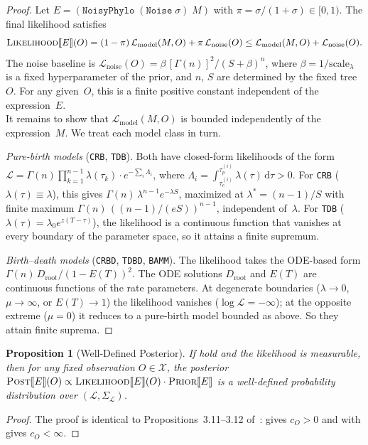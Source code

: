 \documentclass[11pt,a4paper]{article}
\newtheorem{proposition}[proposition]{Proposition}
\newcommand{\LL}{\mathcal{L}}
\newcommand{\XX}{\mathcal{X}}
\newcommand{\Prior}{\textsc{Prior}}
\newcommand{\Likelihood}{\textsc{Likelihood}}
\newcommand{\Post}{\textsc{Post}}
\newcommand{\sem}[1]{\llbracket #1 \rrbracket}
\begin{document}
\begin{proof}
Let $E = (\texttt{NoisyPhylo}\;(\texttt{Noise}\;\sigma)\;M)$ with
$\pi = \sigma/(1+\sigma) \in [0,1)$.  The final likelihood satisfies
\begin{equation}\label{eq:lik-split}
  \Likelihood\sem{E}(O)
  = (1-\pi)\,\LL_{\mathrm{model}}(M, O)
  + \pi\,\LL_{\mathrm{noise}}(O)
  \leq \LL_{\mathrm{model}}(M, O) + \LL_{\mathrm{noise}}(O).
\end{equation}
The noise baseline is
$\LL_{\mathrm{noise}}(O) = \beta\,[\Gamma(n)]^2 / (S+\beta)^n$, where
$\beta = 1/\text{scale}_\lambda$ is a fixed hyperparameter of the
prior, and $n$, $S$ are determined by the fixed tree~$O$.  For any
given~$O$, this is a finite positive constant independent of the
expression~$E$.\\
It remains to show that $\LL_{\mathrm{model}}(M, O)$ is bounded
independently of the expression~$M$.  We treat each model class in
turn.

\emph{Pure-birth models} (\texttt{CRB}, \texttt{TDB}).  Both have
closed-form likelihoods of the form
$\LL = \Gamma(n) \prod_{k=1}^{n-1} \lambda(\tau_k)
\cdot e^{-\sum_i \Lambda_i}$,
where $\Lambda_i = \int_{\tau_c^{(i)}}^{\tau_p^{(i)}} \lambda(\tau)\,
\mathrm{d}\tau > 0$.  For \texttt{CRB} ($\lambda(\tau) \equiv \lambda$),
this gives $\Gamma(n)\,\lambda^{n-1} e^{-\lambda S}$, maximized at
$\lambda^* = (n-1)/S$ with finite maximum
$\Gamma(n)\,((n-1)/(eS))^{n-1}$, independent of~$\lambda$.
For \texttt{TDB} ($\lambda(\tau) = \lambda_0 e^{z(T-\tau)}$), the
likelihood is a continuous function that vanishes at
every boundary of the parameter space, so it attains a finite
supremum.

\emph{Birth--death models} (\texttt{CRBD}, \texttt{TDBD},
\texttt{BAMM}).  The likelihood takes the ODE-based form
$\Gamma(n)\,D_{\mathrm{root}} / (1 - E(T))^2$.  The ODE solutions
$D_{\mathrm{root}}$ and $E(T)$ are continuous functions of the rate
parameters.  At degenerate boundaries ($\lambda \to 0$,
$\mu \to \infty$, or $E(T) \to 1$) the likelihood vanishes
($\log \LL = -\infty$); at the opposite extreme ($\mu = 0$) it reduces
to a pure-birth model bounded as above. So they attain finite suprema.
\end{proof}

\begin{proposition}[Well-Defined Posterior]\label{prop:posterior}
If  hold and the
likelihood is measurable, then for any fixed observation $O \in \XX$,
the posterior $\Post\sem{E}(O) \propto \Likelihood\sem{E}(O) \cdot
\Prior\sem{E}$ is a well-defined probability distribution over
$(\LL, \Sigma_\LL)$.
\end{proposition}
\begin{proof}
The proof is identical to Propositions~3.11--3.12
of~\cite{saad2023}:  gives $c_O > 0$ and
 with  gives $c_O < \infty$.
\end{proof}
\end{document}
